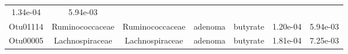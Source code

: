\documentclass[11pt,]{article}
\begin{document}
\begin{longtable}[]{@{}ccccccc@{}}
\begin{minipage}[t]{0.09\columnwidth}
1.34e-04\strut
\end{minipage} & \begin{minipage}[t]{0.09\columnwidth}\centering\strut
5.94e-03\strut
\end{minipage}\tabularnewline
\begin{minipage}[t]{0.09\columnwidth}\centering\strut
Otu01114\strut
\end{minipage} & \begin{minipage}[t]{0.17\columnwidth}\centering\strut
Ruminococcaceae\strut
\end{minipage} & \begin{minipage}[t]{0.17\columnwidth}\centering\strut
Ruminococcaceae\strut
\end{minipage} & \begin{minipage}[t]{0.09\columnwidth}\centering\strut
adenoma\strut
\end{minipage} & \begin{minipage}[t]{0.11\columnwidth}\centering\strut
butyrate\strut
\end{minipage} & \begin{minipage}[t]{0.09\columnwidth}\centering\strut
1.20e-04\strut
\end{minipage} & \begin{minipage}[t]{0.09\columnwidth}\centering\strut
5.94e-03\strut
\end{minipage}\tabularnewline
\begin{minipage}[t]{0.09\columnwidth}\centering\strut
Otu00005\strut
\end{minipage} & \begin{minipage}[t]{0.17\columnwidth}\centering\strut
Lachnospiraceae\strut
\end{minipage} & \begin{minipage}[t]{0.17\columnwidth}\centering\strut
Lachnospiraceae\strut
\end{minipage} & \begin{minipage}[t]{0.09\columnwidth}\centering\strut
adenoma\strut
\end{minipage} & \begin{minipage}[t]{0.11\columnwidth}\centering\strut
butyrate\strut
\end{minipage} & \begin{minipage}[t]{0.09\columnwidth}\centering\strut
1.81e-04\strut
\end{minipage} & \begin{minipage}[t]{0.09\columnwidth}\centering\strut
7.25e-03\strut
\end{minipage}\tabularnewline

\end{longtable}
\end{document}
